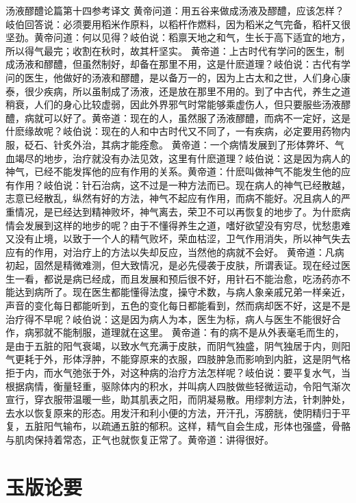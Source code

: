 \documentclass[a4paper,12pt,UTF8,twoside]{ctexbook}
\begin{document}
汤液醪醴论篇第十四参考译文
黄帝问道：用五谷来做成汤液及醪醴，应该怎样？岐伯回答说：必须要用稻米作原料，以稻杆作燃料，因为稻米之气完备，稻杆又很坚劲。黄帝问道：何以见得？岐伯说：稻禀天地之和气，生长于高下适宜的地方，所以得气最完；收割在秋时，故其杆坚实。
黄帝道：上古时代有学问的医生，制成汤液和醪醴，但虽然制好，却备在那里不用，这是什麽道理？岐伯说：古代有学问的医生，他做好的汤液和醪醴，是以备万一的，因为上古太和之世，人们身心康泰，很少疾病，所以虽制成了汤液，还是放在那里不用的。到了中古代，养生之道稍衰，人们的身心比较虚弱，因此外界邪气时常能够乘虚伤人，但只要服些汤液醪醴，病就可以好了。黄帝道：现在的人，虽然服了汤液醪醴，而病不一定好，这是什麽缘故呢？岐伯说：现在的人和中古时代又不同了，一有疾病，必定要用药物内服，砭石、针炙外治，其病才能痊愈。
黄帝道：一个病情发展到了形体弊坏、气血竭尽的地步，治疗就没有办法见效，这里有什麽道理？岐伯说：这是因为病人的神气，已经不能发挥他的应有作用的关系。黄帝道：什麽叫做神气不能发生他的应有作用？岐伯说：针石治病，这不过是一种方法而已。现在病人的神气已经散越，志意已经散乱，纵然有好的方法，神气不起应有作用，而病不能好。况且病人的严重情况，是已经达到精神败坏，神气离去，荣卫不可以再恢复的地步了。为什麽病情会发展到这样的地步的呢？由于不懂得养生之道，嗜好欲望没有穷尽，忧愁患难又没有止境，以致于一个人的精气败坏，荣血枯涩，卫气作用消失，所以神气失去应有的作用，对治疗上的方法以失却反应，当然他的病就不会好。
黄帝道：凡病初起，固然是精微难测，但大致情况，是必先侵袭于皮肤，所谓表证。现在经过医生一看，都说是病已经成，而且发展和预后很不好，用针石不能治愈，吃汤药亦不能达到病所了。现在医生都能懂得法度，操守术数，与病人象亲戚兄弟一样亲近，声音的变化每日都能听到，五色的变化每日都能看到，然而病却医不好，这是不是治疗得不早呢？岐伯说：这是因为病人为本，医生为标，病人与医生不能很好合作，病邪就不能制服，道理就在这里。
黄帝道：有的病不是从外表毫毛而生的，是由于五脏的阳气衰竭，以致水气充满于皮肤，而阴气独盛，阴气独居于内，则阳气更耗于外，形体浮肿，不能穿原来的衣服，四肢肿急而影响到内脏，这是阴气格拒于内，而水气弛张于外，对这种病的治疗方法怎样呢？岐伯说：要平复水气，当根据病情，衡量轻重，驱除体内的积水，并叫病人四肢做些轻微运动，令阳气渐次宣行，穿衣服带温暖一些，助其肌表之阳，而阴凝易散。用缪刺方法，针刺肿处，去水以恢复原来的形态。用发汗和利小便的方法，开汗孔，泻膀胱，使阴精归于平复，五脏阳气输布，以疏通五脏的郁积。这样，精气自会生成，形体也强盛，骨骼与肌肉保持着常态，正气也就恢复正常了。黄帝道：讲得很好。

\chapter{玉版论要}
\end{document}
